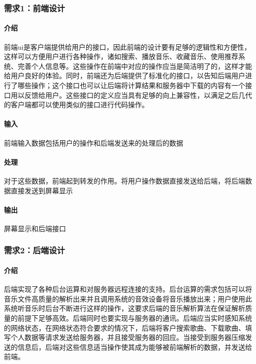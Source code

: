 \subsubsection{需求1：前端设计}

\paragraph{介绍}

前端ui是客户端提供给用户的接口，因此前端的设计要有足够的逻辑性和方便性，这样可以方便用户进行各种操作，诸如搜索、播放音乐、收藏音乐、使用推荐系统、完善个人信息等。这些操作在前端中对应的操作应当是简洁明了的，这样才能给用户良好的体验。同时，前端还为后端提供了标准化的接口，以告知后端用户进行了哪些操作；这个接口也可以让后端将计算结果和服务器中下载的内容有一个接口用以反馈给用户。这些接口的定义应当具有足够的向上兼容性，以满足之后几代的客户端都可以使用类似的接口进行代码操作。

\paragraph{输入}

前端输入数据包括用户的操作和后端发送来的处理后的数据

\paragraph{处理}

对于这些数据，前端起到转发的作用。将用户操作数据直接发送给后端，将后端数据直接发送到屏幕显示

\paragraph{输出}

屏幕显示和后端接口


\subsubsection{需求2：后端设计}

\paragraph{介绍}

后端实现了各种后台运算和对服务器远程连接的支持。后台运算的需求包括可以将音乐文件高质量的解析出来并且调用系统的音效设备将音乐播放出来；用户使用此系统听音乐时后台不断进行这样的操作，这要求后端的音乐解析算法在保证解析质量的前提下足够高效。后端同时也要实现与服务器的通讯。后端应当实时感知系统的网络状态，在网络状态符合要求的情况下，后端将客户搜索歌曲、下载歌曲、填写个人数据等请求发送给服务器，并且接受服务器的回应。当接受到服务器压缩发送的信息后，后端对这些信息适当操作使其成为能够被前端解析的数据，并发送给前端。

